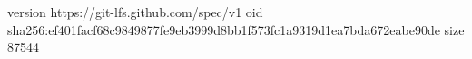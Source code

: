 version https://git-lfs.github.com/spec/v1
oid sha256:ef401facf68c9849877fe9eb3999d8bb1f573fc1a9319d1ea7bda672eabe90de
size 87544
